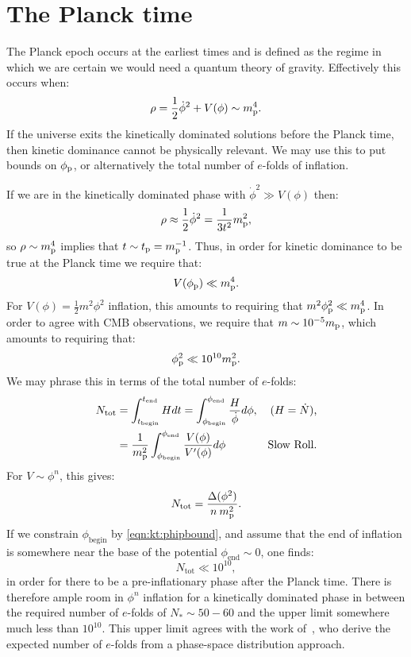 \section{The Planck time}
The Planck epoch occurs at the earliest times and is defined as the
regime in which we are certain we would need a quantum theory of
gravity. Effectively this occurs when:
\begin{equation}
  \rho = \frac{1}{2}\dot\phi^2 + V(\phi)  \sim m_{\mathrm{p}}^4.
  \label{eqn:kt:rhosim}
\end{equation}
If the universe exits the kinetically dominated solutions before the
Planck time, then kinetic dominance cannot be physically relevant. We
may use this to put bounds on \(\phi_{\mathrm{p}}\), or alternatively the total
number of \(e\)-folds of inflation.

If we are in the kinetically dominated phase with \(\dot{\phi}^2\gg
V(\phi)\) then:
\begin{equation}
  \rho \approx \frac{1}{2}\dot\phi^2= \frac{1}{3t^2}m_{\mathrm{p}}^2 ,
  \label{eqn:kt:rhop}
\end{equation}
so \(\rho\sim m_{\mathrm{p}}^4\) implies that \(t\sim t_{\mathrm{p}}=m_{\mathrm{p}}^{-1}\). Thus, in order for
kinetic dominance to be true at the Planck time we require that:
\begin{equation}
  V(\phi_{\mathrm{p}}) \ll m_{\mathrm{p}}^4.
\end{equation}
For \(V(\phi) = \frac{1}{2}m^2\phi^2\) inflation, this amounts to requiring that \(m^2\phi_{\mathrm{p}}^2\ll m_{\mathrm{p}}^4\). In order to agree with CMB observations, we require
that \(m\sim10^{-5}m_{\mathrm{p}}\), which amounts to requiring that:
\begin{equation}
 \phi_{\mathrm{p}}^2 \ll 10^{10}m_{\mathrm{p}}^2.
 \label{eqn:kt:phipbound}
\end{equation}
We may phrase this in terms of the total number of \(e\)-folds:
\begin{align}
  N_\mathrm{tot} 
  &=\int_{t_\mathrm{begin}}^{t_\mathrm{end}} H dt 
  =\int_{\phi_\mathrm{begin}}^{\phi_\mathrm{end}} 
       \frac{H}{\dot{\phi}}d\phi,  &\text{(\(H=\dot{N}\)),}
  \\
  &=\frac{1}{m_{\mathrm{p}}^2}\int_{\phi_\mathrm{begin}}^{\phi_\mathrm{end}}
     {\frac{V(\phi)}{V^\prime(\phi)}}d\phi &\text{Slow Roll.}
\end{align}
For \(V\sim\phi^n\), this gives:
\begin{equation}
  N_\mathrm{tot} = \frac{\Delta (\phi^2) }{n\:m_{\mathrm{p}}^2}.
\end{equation}
If we constrain \(\phi_\mathrm{begin}\) by \eqref{eqn:kt:phipbound}, and assume that the end of inflation  is somewhere near the base of the potential \(\phi_\mathrm{end}\sim0\), one finds: 
\begin{equation}
  N_\mathrm{tot}\ll 10^{10},
\end{equation}
in order for there to be a pre-inflationary phase after the Planck time.
There is therefore ample room in $\phi^n$ inflation for a kinetically dominated phase in between the required number of \(e\)-folds of \(N_*\sim50-60\) and the upper limit somewhere much less than $10^{10}$. This upper limit agrees with the work of~\cite{how_many_e_folds}, who derive the expected number of \(e\)-folds from a phase-space distribution approach.

